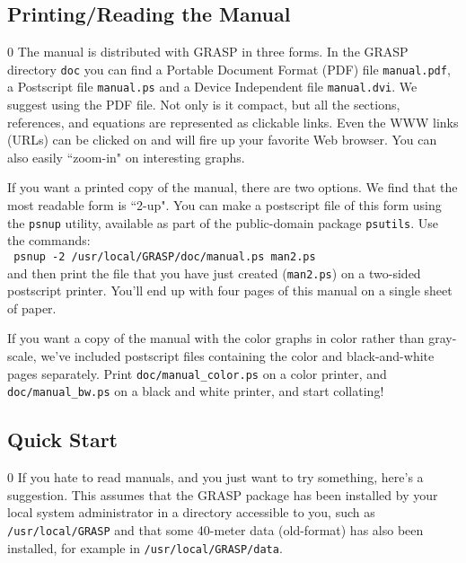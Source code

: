 \subsection{Printing/Reading the Manual}
\setcounter{equation}0
The manual is distributed with GRASP in three forms.  In the GRASP
directory {\tt doc} you can find a Portable Document Format (PDF) file
{\tt manual.pdf}, a Postscript file {\tt manual.ps} and a Device Independent
file {\tt manual.dvi}.  We suggest using the PDF file.  Not only is it
compact, but all the sections, references, and equations are represented
as clickable links.  Even the WWW links (URLs) can be clicked on and will fire
up your favorite Web browser.  You can also easily ``zoom-in" on interesting
graphs.

If you want a printed copy of the manual, there are two options.
We find that the most readable form is ``2-up".  You can make a
postscript file of this form using the {\tt psnup} utility, available as
part of the public-domain package {\tt psutils}.  Use the commands:\\
{\tt
psnup -2 /usr/local/GRASP/doc/manual.ps man2.ps\\
}
and then print the file that you have just created ({\tt man2.ps}) on a two-sided postscript printer.  You'll end up with four pages of this
manual on a single sheet of paper.

If you want a copy of the manual with the color graphs in color rather than gray-scale,
we've included postscript files containing
the color and black-and-white pages separately.  Print
{\tt doc/manual\_color.ps} on a color printer, and {\tt doc/manual\_bw.ps}
on a black and white printer, and start collating!

\subsection{Quick Start}
\setcounter{equation}0
If you hate to read manuals, and you just want to try something, here's
a suggestion.  This assumes that the GRASP package has been installed
by your local system administrator in a directory accessible to you,
such as {\tt /usr/local/GRASP} and that some 40-meter data (old-format)
has also been installed, for example in {\tt /usr/local/GRASP/data}.

